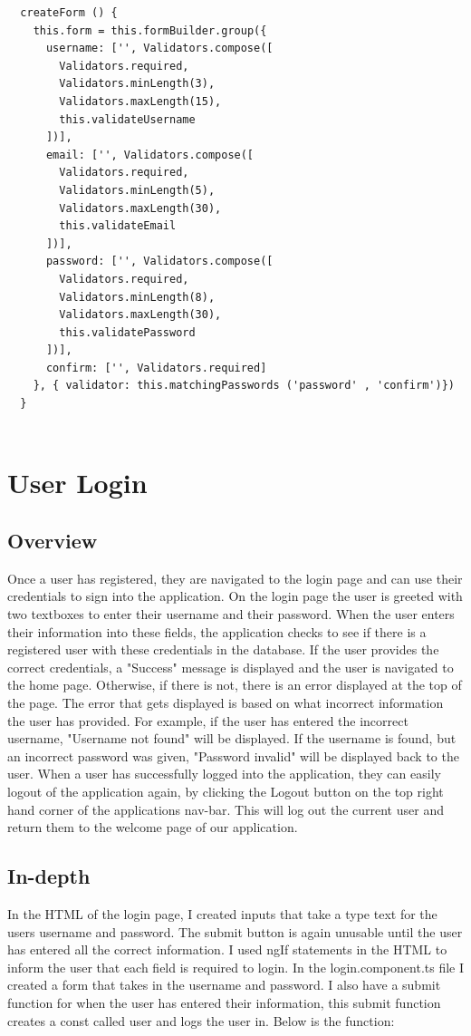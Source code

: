 \begin{lstlisting}
  createForm () {
    this.form = this.formBuilder.group({
      username: ['', Validators.compose([
        Validators.required,
        Validators.minLength(3),
        Validators.maxLength(15),
        this.validateUsername
      ])],
      email: ['', Validators.compose([
        Validators.required,
        Validators.minLength(5),
        Validators.maxLength(30),
        this.validateEmail
      ])],
      password: ['', Validators.compose([
        Validators.required,
        Validators.minLength(8),
        Validators.maxLength(30),
        this.validatePassword
      ])],
      confirm: ['', Validators.required]
    }, { validator: this.matchingPasswords ('password' , 'confirm')})
  }
  
\end{lstlisting}

\section{User Login}

\subsection{Overview}
Once a user has registered, they are navigated to the login page and can use their credentials to sign into the application. On the login page the user is greeted with two textboxes to enter their username and their password. When the user enters their information into these fields, the application checks to see if there is a registered user with these credentials in the database. If the user provides the correct credentials, a "Success" message is displayed and the user is navigated to the home page. Otherwise, if there is not, there is an error displayed at the top of the page. The error that gets displayed is based on what incorrect information the user has provided. For example, if the user has entered the incorrect username, "Username not found" will be displayed. If the username is found, but an incorrect password was given, "Password invalid" will be displayed back to the user. When a user has successfully logged into the application, they can easily logout of the application again, by clicking the Logout button on the top right hand corner of the applications nav-bar. This will log out the current user and return them to the welcome page of our application.

\subsection{In-depth}
In the HTML of the login page, I created inputs that take a type text for the users username and password. The submit button is again unusable until the user has entered all the correct information. I used ngIf statements in the HTML to inform the user that each field is required to login. In the login.component.ts file I created a form that takes in the username and password. I also have a submit function for when the user has entered their information, this submit function creates a const called user and logs the user in. Below is the function:


